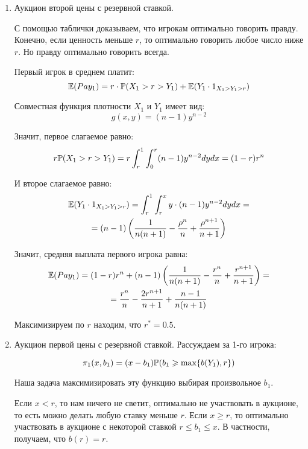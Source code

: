 \begin{enumerate}
\item Аукцион второй цены с резервной ставкой.

С помощью таблички доказываем, что игрокам оптимально говорить правду. Конечно, если ценность меньше $ r $, то оптимально говорить любое число ниже $ r $. Но правду оптимально говорить всегда.

Первый игрок в среднем платит:
\begin{equation}
\E(Pay_{1})=r\cdot \P(X_{1}>r>Y_{1})+\E(Y_{1}\cdot 1_{X_{1}>Y_{1}>r})
\end{equation}

Совместная функция плотности $ X_{1} $ и $ Y_{1} $ имеет вид:
\begin{equation}
g(x,y)=(n-1)y^{n-2}
\end{equation}

Значит, первое слагаемое равно:
\begin{equation}
r\P(X_{1}>r>Y_{1})=r\int_{r}^{1}\int_{0}^{r} (n-1)y^{n-2} dy dx=(1-r)r^{n}
\end{equation}

И второе слагаемое равно:
\begin{multline} \label{E_Y_1XYr}
\E(Y_{1}\cdot 1_{X_{1}>Y_{1}>r})=\int_{r}^{1}\int_{r}^{x} y\cdot (n-1)y^{n-2} dy dx=\\
=(n-1)\left(\frac{1}{n(n+1)}-\frac{\rho^{n}}{n}+\frac{\rho^{n+1}}{n+1}\right)
\end{multline}

Значит, средняя выплата первого игрока равна:
\begin{multline}
\E(Pay_{1})=(1-r)r^{n}+(n-1)\left(\frac{1}{n(n+1)}-\frac{r^{n}}{n}+\frac{r^{n+1}}{n+1}\right)=\\
=\frac{r^{n}}{n}-\frac{2r^{n+1}}{n+1}+\frac{n-1}{n(n+1)}
\end{multline}

Максимизируем по $ r $ находим, что $ r^{*}=0.5 $.


\item Аукцион первой цены с резервной ставкой. Рассуждаем за 1-го игрока:

\begin{equation}
\pi_{1}(x,b_{1})=(x-b_{1})\P(b_{1}\geq \max\{b(Y_{1}),r\})
\end{equation}

Наша задача максимизировать эту функцию выбирая произвольное $ b_{1} $.

Если $ x<r $, то нам ничего не светит, оптимально не участвовать в аукционе, то есть можно делать любую ставку меньше $ r $. Если $ x\geq r $, то оптимально участвовать в аукционе с некоторой ставкой $ r\leq b_{1}\leq x $. В частности, получаем, что $ b(r)=r$.



\end{enumerate}
